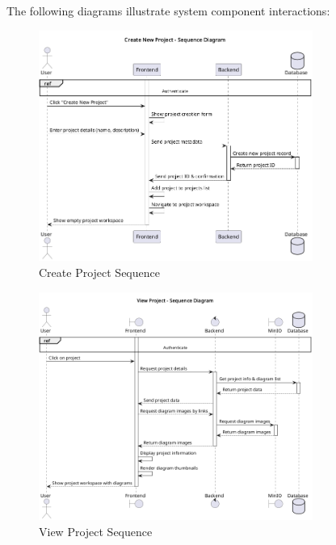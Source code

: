 The following diagrams illustrate system component interactions:

\begin{figure}[H]
\centering
\includegraphics[width=0.8\textwidth]{conception/SprintIII/sequence_diagrams/sequence_projectManagement_3_1_CreateNewProject.png}
\caption{Create Project Sequence}
\label{fig:seq_create_project}
\end{figure}

\begin{figure}[H]
\centering
\includegraphics[width=0.8\textwidth]{conception/SprintIII/sequence_diagrams/sequence_projectManagement_3_2_ViewProjectDetails.png}
\caption{View Project Sequence}
\label{fig:seq_view_project}
\end{figure}

